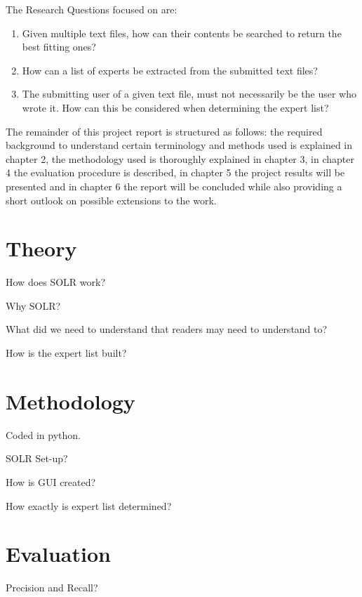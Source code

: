 \documentclass[a4paper,12pt]{article}
\begin{document}
The Research Questions focused on are:
\begin{enumerate}
\item Given multiple text files, how can their contents be searched to return the best fitting ones?  
\item How can a list of experts be extracted from the submitted text files?  
\item The submitting user of a given text file, must not necessarily be the user who wrote it. 
      How can this be considered when determining the expert list?
\end{enumerate}

The remainder of this project report is structured as follows: 
the required background to understand certain terminology and methods used is explained in chapter 2, 
the methodology used is thoroughly explained in chapter 3, 
in chapter 4 the evaluation procedure is described, 
in chapter 5 the project results will be presented 
and in chapter 6 the report will be concluded while also providing a short outlook on possible extensions to the work.


\section{Theory} %
How does SOLR work?

Why SOLR?

What did we need to understand that readers may need to understand to?

How is the expert list built?


\section{Methodology} %
Coded in python.

SOLR Set-up?

How is GUI created?

How exactly is expert list determined?


\section{Evaluation} %
Precision and Recall?
\end{document}
